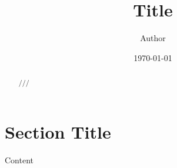 \documentclass[twocolumn]{article}
\begin{document}
\title{Title}
\author{Author}
\date{\today}
\maketitle

\begin{abstract}///\end{abstract}

\section{Section Title}
Content

\end{document}
